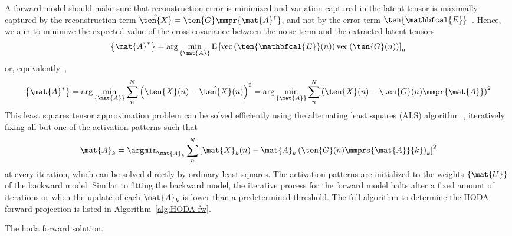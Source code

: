 A forward model should make sure that reconstruction error is minimized and
variation captured in the latent tensor is maximally captured by the
reconstruction term $\hat{\ten{X}}= \ten{G}\mmpr{\mat{A}^\intercal}$, and not by the error term
$\ten{\mathbfcal{E}}$~\cite{Haufe2014}.
Hence, we aim to minimize the expected value of the cross-covariance between
the noise term and the extracted latent tensors
\begin{equation}
	\left\{\mat{A}^*\right\} = \arg\min_{\{\mat{A}\}}\text{E}\left[\text{vec}\left({\ten{\mathbfcal{E}}(n)}\right)\text{vec}\left({\ten{G}(n)}\right)\right]_n
\end{equation}
or, equivalently~\cite{Parra2005,Haufe2014},
\begin{equation}
	\left\{\mat{A}^*\right\} = \arg\min_{\{\mat{A}\}}\sum_n^N\left(\ten{X}(n)
  -\hat{\ten{X}}(n)\right)^2
  = \arg\min_{\{\mat{A}\}}\sum_n^N\left(\ten{X}(n) - \ten{G}(n)\mmpr{\mat{A}}\right)^2
\end{equation}
This least squares tensor approximation problem can be solved efficiently using the
alternating least squares (ALS) algorithm~\cite{Bentbib2022},%
iteratively fixing all but one of the activation patterns such that
\begin{equation}
	\mat{A}_k = \argmin_{\mat{A}_k}
	\sum_n^N\left[\mat{X}_k(n) -
		\mat{A}_k\left(\ten{G}(n)\mmprs{\mat{A}}{k}\right)_k\right]^2
\end{equation}
at every iteration, which can be solved directly by ordinary least squares.
The activation patterns are initialized to the weights $\{\mat{U}\}$ of the
backward model.
Similar to fitting the backward model, the iterative process for the forward
model halts after a fixed amount of iterations or when the update of each
$\mat{A}_k$ is lower than a predetermined threshold.
The full algorithm to determine the HODA forward projection is listed
in Algorithm~\ref{alg:HODA-fw}.
\begin{algorithm}
  \caption[The \ac{hoda} forward solution.]{The \ac{hoda} forward solution.}
	\label{alg:HODA-fw}
	
\end{algorithm}


